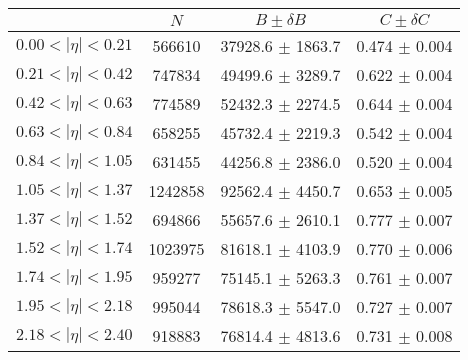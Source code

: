 \begin{tabular}{lccc}
\hline
    &   $N$   & $B \pm \delta B$  &  $C \pm \delta C$ \\
\hline
$0.00 < |\eta| <0.21$          & 566610     & 37928.6    $\pm$ 1863.7 & 0.474      $\pm$ 0.004 \\
$0.21 < |\eta| <0.42$          & 747834     & 49499.6    $\pm$ 3289.7 & 0.622      $\pm$ 0.004 \\
$0.42 < |\eta| <0.63$          & 774589     & 52432.3    $\pm$ 2274.5 & 0.644      $\pm$ 0.004 \\
$0.63 < |\eta| <0.84$          & 658255     & 45732.4    $\pm$ 2219.3 & 0.542      $\pm$ 0.004 \\
$0.84 < |\eta| <1.05$          & 631455     & 44256.8    $\pm$ 2386.0 & 0.520      $\pm$ 0.004 \\
$1.05 < |\eta| <1.37$          & 1242858    & 92562.4    $\pm$ 4450.7 & 0.653      $\pm$ 0.005 \\
$1.37 < |\eta| <1.52$          & 694866     & 55657.6    $\pm$ 2610.1 & 0.777      $\pm$ 0.007 \\
$1.52 < |\eta| <1.74$          & 1023975    & 81618.1    $\pm$ 4103.9 & 0.770      $\pm$ 0.006 \\
$1.74 < |\eta| <1.95$          & 959277     & 75145.1    $\pm$ 5263.3 & 0.761      $\pm$ 0.007 \\
$1.95 < |\eta| <2.18$          & 995044     & 78618.3    $\pm$ 5547.0 & 0.727      $\pm$ 0.007 \\
$2.18 < |\eta| <2.40$          & 918883     & 76814.4    $\pm$ 4813.6 & 0.731      $\pm$ 0.008 \\
\hline
\end{tabular}

